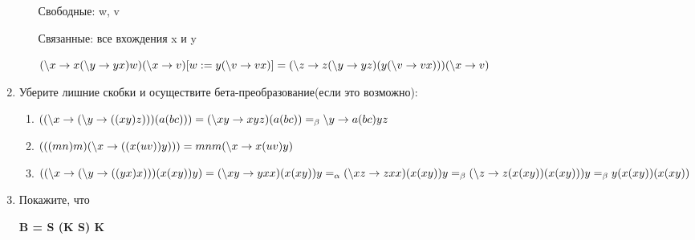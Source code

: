 \documentclass[fontsize=14pt, paper=a4, pagesize, DIV=calc]{article}
\newcommand{\lam}[2]{\backslash #1 \rightarrow #2}
\begin{document}
\begin{enumerate}
\begin{enumerate}
Свободные: w, v

Связанные: все вхождения x и y

$(\lam{x}{x (\lam{y}{y x}) w}) (\lam{x}{v}) [w := y (\lam{v}{v x})] \\
= (\lam{z}{z (\lam{y}{y z}) (y (\lam{v}{v x}))}) (\lam{x}{v})$

\end{enumerate}

\item Уберите лишние скобки и осуществите бета-преобразование(если это возможно):

\begin{enumerate}

\item $((\lam{x}{(\lam{y}{((x y) z)})}) (a (b c))) \\
= (\lam{xy}{x y z}) (a (b c)) \\
=_{\beta} \lam{y}{a (b c) y z}  $

\item $(((m n) m) (\lam{x}{((x (u v)) y)})) \\
= m n m (\lam{x}{x (u v) y}) $

\item $((\lam{x}{(\lam{y}{((y x) x)})}) (x (x y)) y) \\
= (\lam{xy}{y x x}) (x (x y)) y \\
=_{\alpha} (\lam{xz}{z x x}) (x (x y)) y \\
=_{\beta} (\lam{z}{z (x (x y)) (x (x y))}) y \\
=_{\beta} y (x (x y)) (x (x y))
$

\end{enumerate}

\item Покажите, что

{\bf B = S (K S) K }


\end{enumerate}
\end{document}
